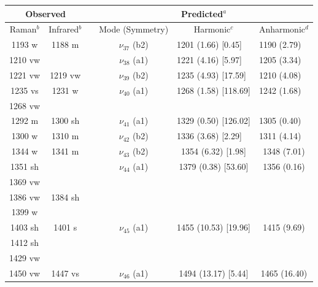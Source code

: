  \begin{table}[H]
 	\begin{center}
 		\begin{threeparttable}
 			\begin{tabular}{c c c c c c}
 				\hline
 				\multicolumn{ 2}{c}{Observed} & \multicolumn{1}{c}{} & \multicolumn{ 3}{c}{Predicted$^{a}$} \\ \hline
 				Raman$^{b}$ & \multicolumn{1}{c}{Infrared$^{b}$} &  & \multicolumn{1}{c}{Mode (Symmetry)} & \multicolumn{1}{c}{Harmonic$^{c}$} & Anharmonic$^{d}$ \\ \hline 
 				1193 w & 1188 m & \multicolumn{1}{l}{} & $\nu_{37}$ (b2) & \multicolumn{1}{l}{1201 (1.66) [0.45]} & \multicolumn{1}{l}{1190 (2.79)} \\ 
 				1210 vw &  & \multicolumn{1}{l}{} & $\nu_{38}$ (a1) & \multicolumn{1}{l}{1221 (4.16) [5.97]} & \multicolumn{1}{l}{1205 (3.34)} \\ 
 				1221 vw & 1219 vw & \multicolumn{1}{l}{} & $\nu_{39}$ (b2) & \multicolumn{1}{l}{1235 (4.93) [17.59]} & \multicolumn{1}{l}{1210 (4.08)} \\ 
 1235 vs & 1231 w & \multicolumn{1}{l}{} & $\nu_{40}$ (a1) & \multicolumn{1}{l}{1268 (1.58) [118.69]} & \multicolumn{1}{l}{1242 (1.68)} \\ 
 1268 vw &  & \multicolumn{1}{l}{} &  & \multicolumn{1}{l}{} & \multicolumn{1}{l}{} \\ 
 1292 m & 1300 sh & \multicolumn{1}{l}{} & $\nu_{41}$ (a1) & \multicolumn{1}{l}{1329 (0.50) [126.02]} & \multicolumn{1}{l}{1305 (0.40)} \\ 
 1300 w & 1310 m & \multicolumn{1}{l}{} & $\nu_{42}$ (b2) & \multicolumn{1}{l}{1336 (3.68) [2.29]} & \multicolumn{1}{l}{1311 (4.14)} \\ 
1344 w & 1341 m &  & $\nu_{43}$ (b2) & 1354 (6.32) [1.98] & 1348 (7.01) \\ 
1351 sh &  &  & $\nu_{44}$ (a1) & 1379 (0.38) [53.60] & 1356 (0.16) \\ 
1369 vw &  &  &  &  &  \\ 
1386 vw & 1384 sh &  &  &  &  \\ 
1399 w &  &  &  &  &  \\ 
1403 sh & 1401 s &  & $\nu_{45}$ (a1) & 1455 (10.53) [19.96] & 1415 (9.69) \\ 
1412 sh &  &  &  &  &  \\ 
1429 vw &  &  &  &   &  \\ 
1450 vw & 1447 vs &  & $\nu_{46}$ (a1) &   1494 (13.17) [5.44] & 1465 (16.40) \\ 

\end{tabular}
\end{threeparttable}
\end{center}
\end{table}
